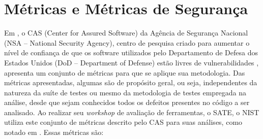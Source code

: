 \section{Métricas e Métricas de Segurança}

Em \cite{nsa}, o CAS (Center for Assured Software) da Agência de Segurança Nacional (NSA – National Security Agency), centro de pesquisa criado para aumentar o nível de confiança de que os software utilizados pelo Departamento de Defesa dos Estados Unidos (DoD – Department of Defense) estão livres de vulnerabilidades \cite{nsa}, apresenta um conjunto de métricas para que se aplique sua metodologia. Das métricas apresentadas, algumas são de propósito geral, ou seja, independentes da natureza da suíte de testes ou mesmo da metodologia de testes empregada na análise, desde que sejam conhecidos todos os defeitos presentes no código a ser analisado. Ao realizar seu \textit{workshop} de avaliação de ferramentas, o SATE, o NIST utiliza este conjunto de métricas descrito pelo CAS para suas análises, como notado em \cite{sate_iv}. Essas métricas são:
